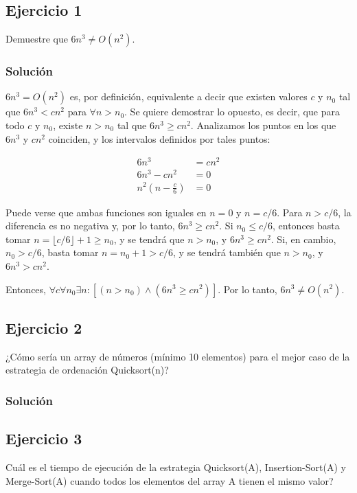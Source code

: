 \documentclass{article}
\begin{document}



\subsection*{Ejercicio 1}
Demuestre que $6n^3 \neq O(n^2)$.
\subsubsection*{Solución}
$6n^3 = O(n^2)$ es, por definición, equivalente a decir que existen valores $c$ y $n_0$ tal que $6n^3 < c n^2$ para $\forall n > n_0$. Se quiere demostrar lo opuesto, es decir, que para todo $c$ y $n_0$, existe $n > n_0$ tal que $6n^3 \geq c n^2$. Analizamos los puntos en los que $6n^3$ y $cn^2$ coinciden, y los intervalos definidos por tales puntos:

\begin{align*}
    6n^3 &= cn^2 \\
    6n^3 - cn^2 &= 0 \\
    n^2 \left (n - \frac{c}{6}\right ) &= 0
\end{align*}

Puede verse que ambas funciones son iguales en $n = 0$ y $n = c/6$. Para $n > c/6$, la diferencia es no negativa y, por lo tanto, $6n^3 \geq c n^2$. Si $n_0 \leq c/6$, entonces basta tomar $n = \lfloor c/6 \rfloor + 1 \geq n_0$, y se tendrá que $n > n_0$, y $6n^3 \geq c n^2$. Si, en cambio, $n_0 > c/6$, basta tomar $n = n_0 + 1 > c/6$, y se tendrá también que $n > n_0$, y $6n^3 > c n^2$.

Entonces, $\forall c \forall n_0 \exists n : [(n > n_0) \land (6n^3 \geq c n^2)]$. Por lo tanto, $6n^3 \neq O(n^2)$.

\subsection*{Ejercicio 2}
¿Cómo sería un array de números (mínimo 10 elementos) para el mejor caso de la estrategia de ordenación Quicksort(n)?
\subsubsection*{Solución}


\subsection*{Ejercicio 3}
Cuál es el tiempo de ejecución de la estrategia Quicksort(A), Insertion-Sort(A) y Merge-Sort(A) cuando todos los elementos del array A tienen el mismo valor?
\end{document}
